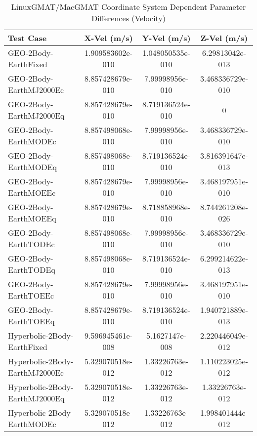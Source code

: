 \begin{table}[htbp!]
\centering
\caption{ LinuxGMAT/MacGMAT Coordinate System Dependent Parameter Differences (Velocity)}
      \begin{tabular}{lccc}
      \hline\hline
          Test Case & X-Vel (m/s) & Y-Vel (m/s) & Z-Vel (m/s) \\
         \hline
         GEO-2Body-EarthFixed & 1.909583602e-010 & 1.048050535e-010 & 6.29813042e-013 \\
         GEO-2Body-EarthMJ2000Ec & 8.857428679e-010 & 7.99998956e-010 & 3.468336729e-010 \\
         GEO-2Body-EarthMJ2000Eq & 8.857428679e-010 & 8.719136524e-010 & 0 \\
         GEO-2Body-EarthMODEc & 8.857498068e-010 & 7.99998956e-010 & 3.468336729e-010 \\
         GEO-2Body-EarthMODEq & 8.857498068e-010 & 8.719136524e-010 & 3.816391647e-013 \\
         GEO-2Body-EarthMOEEc & 8.857428679e-010 & 7.99998956e-010 & 3.468197951e-010 \\
         GEO-2Body-EarthMOEEq & 8.857428679e-010 & 8.718858968e-010 & 8.744261208e-026 \\
         GEO-2Body-EarthTODEc & 8.857498068e-010 & 7.99998956e-010 & 3.468336729e-010 \\
         GEO-2Body-EarthTODEq & 8.857498068e-010 & 8.719136524e-010 & 6.299214622e-013 \\
         GEO-2Body-EarthTOEEc & 8.857428679e-010 & 7.99998956e-010 & 3.468197951e-010 \\
         GEO-2Body-EarthTOEEq & 8.857428679e-010 & 8.719136524e-010 & 1.940721889e-013 \\
         Hyperbolic-2Body-EarthFixed & 9.596945461e-008 & 5.1627147e-008 & 2.220446049e-012 \\
         Hyperbolic-2Body-EarthMJ2000Ec & 5.329070518e-012 & 1.33226763e-012 & 1.110223025e-012 \\
         Hyperbolic-2Body-EarthMJ2000Eq & 5.329070518e-012 & 1.33226763e-012 & 1.33226763e-012 \\
         Hyperbolic-2Body-EarthMODEc & 5.329070518e-012 & 1.33226763e-012 & 1.998401444e-012 \\

\end{tabular}
\end{table}
